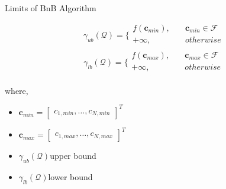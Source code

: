 \documentclass[usenames,dvipsnames]{beamer}
\begin{document}
\begin{frame}{Limits of BnB Algorithm}
  \begin{exampleblock}{\phantom{Tp}}
   \[
     \gamma_{ub}(\mathcal{Q}) = \Bigg\{\begin{array}{ll}f(\mathbf{c}_{min}),\quad &\mathbf{c}_{min}\in\mathcal{F}\\+\infty,\quad &otherwise\\\end{array}	
    \]
    \[
     \gamma_{lb}(\mathcal{Q}) = \Bigg\{\begin{array}{ll}f(\mathbf{c}_{max}),\quad &\mathbf{c}_{max}\in\mathcal{F}\\+\infty,\quad &otherwise\\\end{array}	
     \]
  \end{exampleblock}
  where,
  \begin{itemize}
    \item $\mathbf{c}_{min} = \begin{bmatrix}c_{1,min},\dots,c_{N,min}\end{bmatrix}^T$
    \item $\mathbf{c}_{max} = \begin{bmatrix}c_{1,max},\dots,c_{N,max}\end{bmatrix}^T$
    \item $\gamma_{ub}(\mathcal{Q})$\quad upper bound
    \item $\gamma_{lb}(\mathcal{Q})$\quad lower bound
  \end{itemize}
\end{frame}
\end{document}

